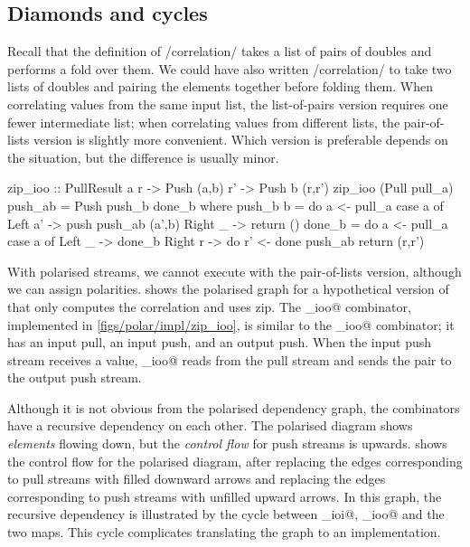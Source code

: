\subsection{Diamonds and cycles}

Recall that the definition of \Hs/correlation/ takes a list of pairs of doubles and performs a fold over them.
We could have also written \Hs/correlation/ to take two lists of doubles and pairing the elements together before folding them.
When correlating values from the same input list, the list-of-pairs version requires one fewer intermediate list; when correlating values from different lists, the pair-of-lists version is slightly more convenient.
Which version is preferable depends on the situation, but the difference is usually minor.


\begin{haskell}[float,caption=Polarised implementation of \Hs/zip\_ioo/,label=figs/polar/impl/zip_ioo]
zip_ioo :: PullResult a r -> Push (a,b) r' -> Push b (r,r')
zip_ioo (Pull pull_a) push_ab = Push push_b done_b
 where
  push_b b = do
   a <- pull_a
   case a of
    Left a' -> push push_ab (a',b)
    Right _ -> return ()
  done_b = do
   a <- pull_a
   case a of
    Left _  -> done_b
    Right r -> do
     r' <- done push_ab
     return (r,r')
\end{haskell}


With polarised streams, we cannot execute \Hs@priceOverTime@ with the pair-of-lists version, although we can assign polarities.
 shows the polarised graph for a hypothetical version of \Hs@priceOverTime@ that only computes the correlation and uses zip.
The \Hs@zip_ioo@ combinator, implemented in \cref{figs/polar/impl/zip_ioo}, is similar to the \Hs@join_ioo@ combinator; it has an input pull, an input push, and an output push.
When the input push stream receives a value, \Hs@zip_ioo@ reads from the pull stream and sends the pair to the output push stream.


Although it is not obvious from the polarised dependency graph, the combinators have a recursive dependency on each other.
The polarised diagram shows \emph{elements} flowing down, but the \emph{control flow} for push streams is upwards.
 shows the control flow for the polarised diagram, after replacing the edges corresponding to pull streams with filled downward arrows and replacing the edges corresponding to push streams with unfilled upward arrows.
In this graph, the recursive dependency is illustrated by the cycle between \Hs@dup_ioi@, \Hs@zip_ioo@ and the two maps.
This cycle complicates translating the graph to an implementation.

